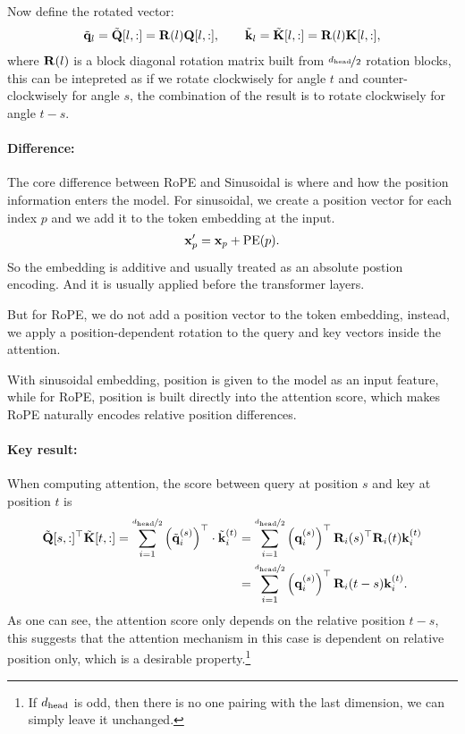 \documentclass[11pt]{article}  %
\begin{document}
Now define the rotated vector: 
\begin{align}
  \tilde{\mathbf{q}}_l = \tilde{\mathbf{Q}}[l, :] = \mathbf{R}(l)\mathbf{Q}[l, :], \qquad \tilde{\mathbf{k}}_l = \tilde{\mathbf{K}}[l, :] = \mathbf{R}(l)\mathbf{K}[l, :],
\end{align}
where $\mathbf{R}(l)$ is a block diagonal rotation matrix built from $\nicefrac{d_{\text{head}}}{2}$ rotation blocks, this can be intepreted as if we rotate clockwisely for angle $t$ and counter-clockwisely for angle $s$, the combination of the result is to rotate clockwisely for angle $t-s$.


\paragraph{Difference:}
The core difference between RoPE and Sinusoidal is where and how the position information enters the model.
For sinusoidal, we create a position vector for each index $p$ and we add it to the token embedding at the input.
\begin{align*}
  \mathbf{x}_p^\prime = \mathbf{x}_p + \text{PE}(p).
\end{align*}
So the embedding is additive and usually treated as an absolute postion encoding.
And it is usually applied before the transformer layers.

But for RoPE, we do not add a position vector to the token embedding, instead, we apply a position-dependent rotation to the query and key vectors inside the attention.

With sinusoidal embedding, position is given to the model as an input feature, while for RoPE, position is built directly into the attention score, which makes RoPE naturally encodes relative position differences.


\paragraph{Key result:}
When computing attention, the score between query at position $s$ and key at position $t$ is 
\begin{align}
  \tilde{\mathbf{Q}}[s, :]^{\top}\tilde{\mathbf{K}}[t, :] = \sum_{i=1}^{\nicefrac{d_{\text{head}}}{2}} \left( \tilde{\mathbf{q}}_i^{(s)} \right)^{\top} \cdot \tilde{\mathbf{k}}_i^{(t)} &= \sum_{i=1}^{\nicefrac{d_{\text{head}}}{2}} \left( \mathbf{q}_i^{(s)} \right)^{\top} \mathbf{R}_i(s)^{\top}\mathbf{R}_i(t) \mathbf{k}_i^{(t)}\notag \\
  &= \sum_{i=1}^{\nicefrac{d_{\text{head}}}{2}} \left( \mathbf{q}_i^{(s)} \right)^{\top}\mathbf{R}_i(t - s) \mathbf{k}_i^{(t)}.
\end{align}
As one can see, the attention score only depends on the relative position $t - s$, this suggests that the attention mechanism in this case is dependent on relative position only, which is a desirable property.\footnote{If $d_{\text{head}}$ is odd, then there is no one pairing with the last dimension, we can simply leave it unchanged.}
\end{document}
